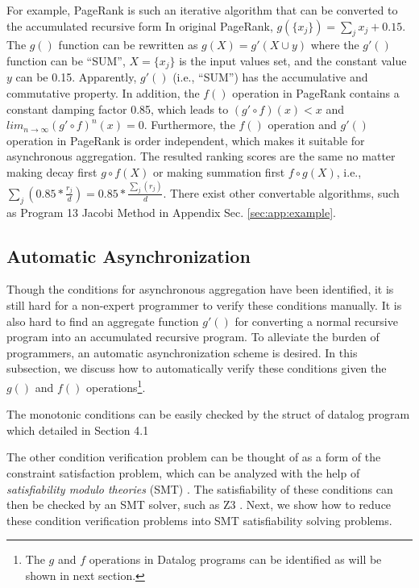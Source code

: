 For example, PageRank is such an iterative algorithm that can be converted to the accumulated recursive form %
In original PageRank, $g(\{x_j\})=\sum_j{x_j}+0.15$. The $g()$ function can be rewritten as $g(X)=g'(X\cup y)$ where the $g'()$ function can be ``SUM'', $X=\{x_j\}$ is the input values set, and the constant value $y$ can be 0.15. Apparently, $g'()$ (i.e., ``SUM'') has the accumulative and commutative property. In addition, the $f()$ operation in PageRank contains a constant damping factor 0.85, which leads to $(g'\circ f)(x)<x$ and $lim_{n\rightarrow\infty}(g'\circ f)^n(x)=0$. Furthermore, the $f()$ operation and $g'()$ operation in PageRank is order independent, which makes it suitable for asynchronous aggregation. The resulted ranking scores are the same no matter making decay first $g\circ f(X)$ or making summation first $f\circ g(X)$, i.e., $\sum_j(0.85*\frac{r_j}{d})=0.85*\frac{\sum_j(r_j)}{d}$. There exist other convertable algorithms, such as Program 13 Jacobi Method in Appendix Sec. \ref{sec:app:example}.


\subsection{Automatic Asynchronization}
\label{sec:async:autoasync}

Though the conditions for asynchronous aggregation have been identified, it is still hard for a non-expert programmer to verify these conditions manually. It is also hard to find an aggregate function $g'()$ for converting a normal recursive program into an accumulated recursive program.
 To alleviate the burden of programmers, an automatic asynchronization scheme is desired. In this subsection, we discuss how to automatically verify these conditions given the $g()$ and $f()$ operations\footnote{The $g$ and $f$ operations in Datalog programs can be identified as will be shown in next section.}.
 
 
 The monotonic conditions can  be easily checked by the struct of datalog program which detailed in Section 4.1

The other condition verification problem can be thought of as a form of the constraint satisfaction problem, which can be analyzed with the help of \emph{satisfiability modulo theories} (SMT) \cite{53e486195688442995f82bfe28c55731}. The satisfiability of these conditions can then be checked by an SMT solver, such as Z3 \cite{DeMoura:2008:ZES:1792734.1792766}. Next, we show how to reduce these condition verification problems into SMT satisfiability solving problems.

